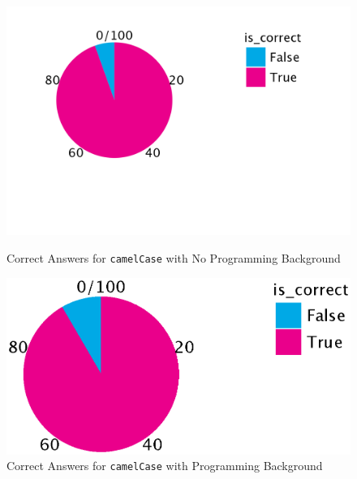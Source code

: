 \documentclass[unicode,11pt,a4paper,oneside,numbers=endperiod,openany]{scrartcl}
\begin{document}
\begin{figure}[h!]
    \centering
    \begin{minipage}{0.45\textwidth}
        \centering
        \includegraphics[width=\textwidth]{./figures/correct_camel_noback.png}
        \caption{Correct Answers for \texttt{camelCase} with No Programming Background}
        \label{fig:correct_camel_noback}
    \end{minipage}
    \hfill
    \begin{minipage}{0.45\textwidth}
        \centering
        \includegraphics[width=\textwidth]{./figures/correct_camel_background.eps}
        \caption{Correct Answers for \texttt{camelCase} with Programming Background}
        \label{fig:correct_camel_background}
    \end{minipage}

    \vspace{0.5cm}


\end{figure}
\end{document}
